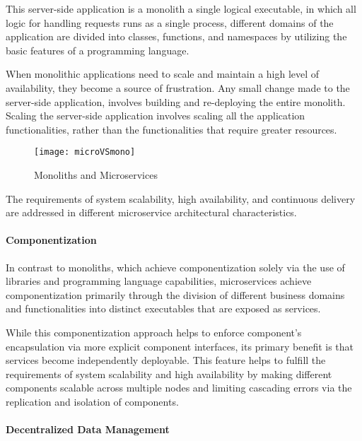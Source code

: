 This server-side application is a monolith a single logical executable, in which all logic for handling requests runs as a single process,
different domains of the application are divided into classes, functions, and namespaces by utilizing the basic features of a programming language.

When monolithic applications need to scale and maintain a high level of availability, they become a source of frustration.
Any small change made to the server-side application, involves building and re-deploying the entire monolith.
Scaling the server-side application involves scaling all the application functionalities, rather than the functionalities that require greater resources.

\begin{figure}[htbp]
    \centering
    \texttt{[image: microVSmono]}
    \caption{Monoliths and Microservices}
    \label{fig:monoliths and microservices}
\end{figure}

The requirements of system scalability, high availability, and continuous delivery are addressed in different microservice architectural characteristics.

\paragraph{Componentization}

In contrast to monoliths, which achieve componentization solely via the use of libraries and programming language capabilities,
microservices achieve componentization primarily through the division of different business domains and functionalities into distinct executables
that are exposed as services.

While this componentization approach helps to enforce component's encapsulation via more explicit component interfaces,
its primary benefit is that services become independently deployable.
This feature helps to fulfill the requirements of system scalability and high availability by
making different components scalable across multiple nodes and limiting cascading errors via the replication and isolation of components.

\paragraph{Decentralized Data Management}

